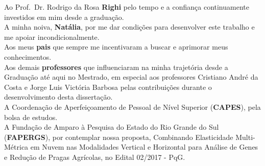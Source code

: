 \documentclass[english,brazilian]{UNISINOSmonografia} %
\begin{document}


\capa
\folhaderosto
\folhadeaprovacao %

%

\begin{agradecimentos}
	
	Ao Prof.~Dr. Rodrigo da Rosa \textbf{Righi} pelo tempo e a confiança continuamente investidos em mim desde a graduação.
	\\[1ex]
	
	A minha noiva, \textbf{Natália}, por me dar condições para desenvolver este trabalho e me apoiar incondicionalmente.
	\\[1ex]
	
	Aos meus \textbf{pais} que sempre me incentivaram a buscar e aprimorar meus conhecimentos.
	\\[1ex]
	
	Aos demais \textbf{professores} que influenciaram na minha trajetória desde a Graduação até aqui no Mestrado, em especial aos professores Cristiano André da Costa e Jorge Luis Victória Barbosa pelas contribuições durante o desenvolvimento desta dissertação.
	\\[1ex]
	
	A Coordenação de Aperfeiçoamento de Pessoal de Nível Superior (\textbf{CAPES}), pela bolsa de estudos.
	\\[1ex]

	A Fundação de Amparo à Pesquisa do Estado do Rio Grande do Sul (\textbf{FAPERGS}), por contemplar nossa proposta, Combinando Elasticidade Multi-Métrica em Nuvem nas Modalidades Vertical e Horizontal para Análise de Genes e Redução de Pragas Agrícolas, no Edital 02/2017 - PqG.

\end{agradecimentos}
\end{document}
